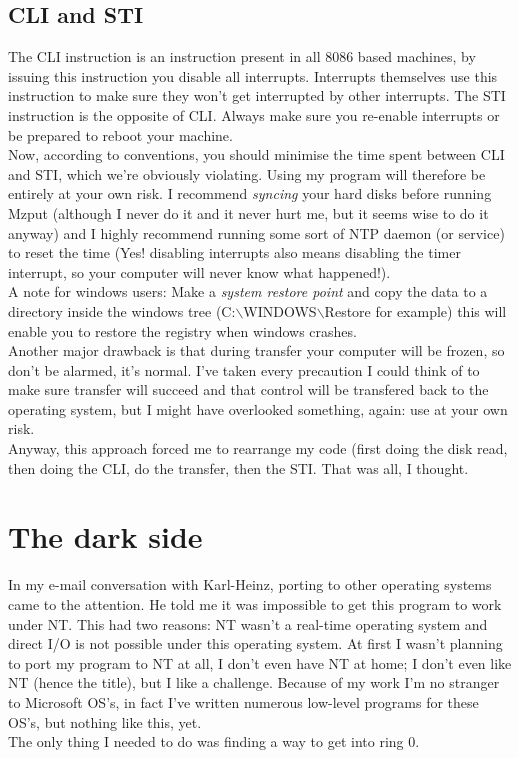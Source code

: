 \subsection{CLI and STI}
The CLI instruction is an instruction present in all 8086 based machines, by
issuing this instruction you disable all interrupts. Interrupts themselves use
this instruction to make sure they won't get interrupted by other interrupts.
The STI instruction is the opposite of CLI. Always make sure you re-enable 
interrupts or be prepared to reboot your machine. \\
Now, according to conventions, you should minimise the time spent between CLI
and STI, which we're obviously violating. Using my program will therefore be
entirely at your own risk. I recommend \emph{syncing} \cite{SNC} your hard 
disks before running
Mzput (although I never do it and it never hurt me, but it seems wise to do 
it anyway) and I highly recommend running some sort of NTP daemon (or service)
to reset the time (Yes! disabling interrupts also means disabling the timer
interrupt, so your computer will never know what happened!). \\
A note for windows users: Make a \emph{system restore point} \cite{SRP} and 
copy the data to a directory inside the windows tree 
(C:$\backslash$WINDOWS$\backslash$Restore for example) this will enable you to
restore the registry when windows crashes. \\
Another major drawback is that during transfer your computer will be frozen, so
don't be alarmed, it's normal. I've taken every precaution I could think of
to make sure transfer will succeed and that control will be transfered back to
the operating system, but I might have overlooked something, again: use at your
own risk.\\
Anyway, this approach forced me to rearrange my code (first doing the disk read,
then doing the CLI, do the transfer, then the STI. That was all, I thought.

\section{The dark side}
In my e-mail conversation with Karl-Heinz, porting to other operating systems 
came to the attention. He told me it was impossible to get this program to 
work under NT. This had two reasons: NT wasn't a real-time operating system 
and direct I/O is not possible under this operating system. At first I wasn't
planning to port my program to NT at all, I don't even have NT at home; I 
don't even like NT (hence the title), but I like a challenge. Because of
my work I'm no stranger to Microsoft OS's, in fact I've written numerous 
low-level programs for these OS's, but nothing like this, yet.\\
The only thing I needed to do was finding a way to get into ring 0.

